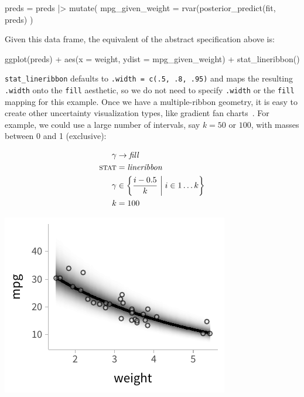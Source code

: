\documentclass[journal]{vgtc}                     %
\newenvironment{centerverbatim}{%
  \hfill\break
  \small
  \centering
  \varwidth{\linewidth}%
  \verbatim
}{%
  \endverbatim
  \endvarwidth
  \par
  \hfill\break
}
\begin{document}
\begin{centerverbatim}
preds = preds |> mutate(
  mpg_given_weight = rvar(posterior_predict(fit, preds)
)
\end{centerverbatim}

Given this data frame, the equivalent of the abstract specification above is:

\begin{centerverbatim}
ggplot(preds) +
  aes(x = weight, ydist = mpg_given_weight) +
  stat_lineribbon()
\end{centerverbatim}

\texttt{stat\_lineribbon} defaults to \texttt{.width = c(.5, .8, .95)} and maps the resulting \texttt{.width} onto the \texttt{fill} aesthetic, so we do not need to specify \texttt{.width} or the \texttt{fill} mapping for this example. Once we have a multiple-ribbon geometry, it is easy to create other uncertainty visualization types, like gradient fan charts~\cite{bowman2019graphics,jackson2008displaying}. For example, we could use a large number of intervals, say $k = 50$ or $100$, with masses between 0 and 1 (exclusive):

\noindent
\begin{minipage}{.5\columnwidth}

\begin{align*}
\gamma &\rightarrow \mathit{fill}\\
\textsc{stat} &= \mathit{lineribbon}\\
\gamma &\in \left\{\frac{i - 0.5}{k} \mathrel{}\middle|\mathrel{} i \in 1 \dots k \right\}\\
k &= 100
\end{align*}
\end{minipage}%
  \begin{minipage}{.4\columnwidth}
    \centering
    \includegraphics[width=1.2\columnwidth]{figs/3-lineribbon_fan.pdf}
  \end{minipage}
\hfill\break
\end{document}
